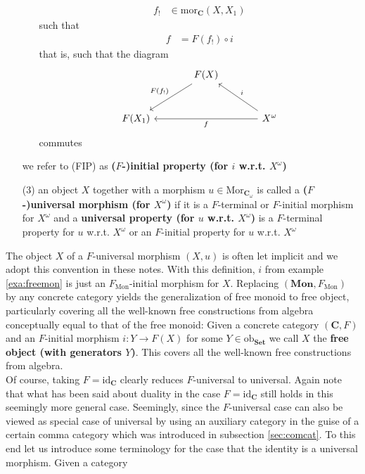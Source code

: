 \begin{enumerate}
\begin{enumerate}
\begin{align*}
  f_{!}
  &\in
  \mathrm{mor}_{\mathbf{C}}(X,X_{1})
\end{align*}
such that
\begin{align*}
  f
  &=
  F(f_{!})
  \circ
  i
\end{align*}
that is, such that the diagram
\[
\begin{tikzcd}[sep=large]
  &
  F(X)
  \arrow[swap]{dl}{F(f_{!})}
  &
  \\
  F(X_{1})
  &
  &
  X^{\omega}
  \arrow{ll}{f}
  \arrow[swap]{lu}{i}
\end{tikzcd}
\]
commutes
\end{enumerate}
we refer to (FIP) as \textbf{($F$-)initial property (for $i$ w.r.t. $X^{\omega}$)}
\item[(3)]
an object $X$ together with a morphism $u \in \mathrm{Mor}_{\mathbf{C}_{\omega}}$ is called a \textbf{($F$-)universal morphism (for $X^{\omega}$)} if it is a $F$-terminal or $F$-initial morphism for $X^{\omega}$ and a \textbf{universal property (for $u$ w.r.t. $X^{\omega}$)} is a $F$-terminal property for $u$ w.r.t. $X^{\omega}$ or an $F$-initial property for $u$ w.r.t. $X^{\omega}$
\end{enumerate}
The object $X$ of a $F$-universal morphism $(X,u)$ is often let implicit and we adopt this convention in these notes. With this definition, $i$ from example \ref{exa:freemon} is just an $F_{\textrm{Mon}}$-initial morphism for $X$. Replacing $(\mathbf{Mon},F_{\textrm{Mon}})$ by any concrete category yields the generalization of free monoid to free object, particularly covering all the well-known {\grqq}free{\grqq} constructions from algebra conceptually equal to that of the free monoid: Given a concrete category $(\mathbf{C},F)$ and an $F$-initial morphism $i \colon Y \rightarrow F(X)$ for some $Y \in \mathrm{ob}_{\mathbf{Set}}$ we call $X$ the \textbf{free object (with generators $Y$)}. This covers all the well-known {\grqq}free{\grqq} constructions from algebra.
\\
Of course, taking $F = \mathrm{id}_{\mathbf{C}}$ clearly reduces $F$-universal to universal. Again note that what has been said about duality in the case $F = \mathrm{id}_{\mathbf{C}}$ still holds in this seemingly more general case. {\glqq}Seemingly{\grqq}, since the $F$-universal case can also be viewed as special case of universal by using an auxiliary category in the guise of a certain comma category which was introduced in subsection \ref{sec:comcat}. To this end let us introduce some terminology for the case that the identity is a universal morphism. Given a category
